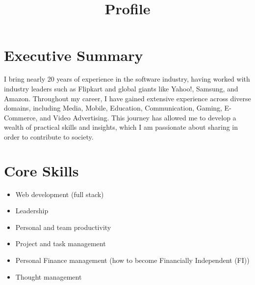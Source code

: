 \documentclass[11pt,a4paper,sans]{moderncv} %
\title{Profile}
\begin{document}
\makecvtitle %

\section{Executive Summary}
I bring nearly 20 years of experience in the software industry, having worked with industry leaders such as Flipkart and global giants like Yahoo!, Samsung, and Amazon. Throughout my career, I have gained extensive experience across diverse domains, including Media, Mobile, Education, Communication, Gaming, E-Commerce, and Video Advertising. This journey has allowed me to develop a wealth of practical skills and insights, which I am passionate about sharing in order to contribute to society.

\section{Core Skills}
  \begin{itemize}
    \item Web development (full stack)
    \item Leadership
    \item Personal and team productivity
    \item Project and task management
    \item Personal Finance management (how to become Financially Independent (FI))
    \item Thought management
  \end{itemize}

\end{document}

